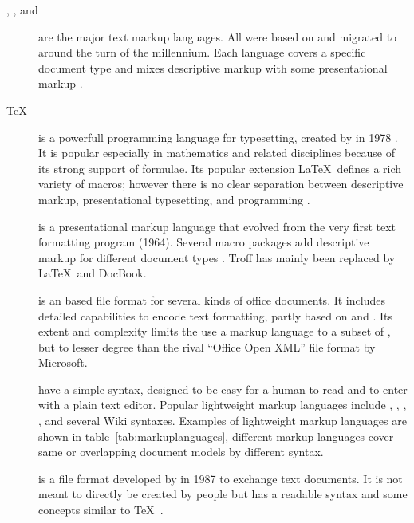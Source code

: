 \begin{description}

\item[, , and ] are the major text
markup languages. All were based on  and migrated to
 around the turn of the millennium. Each language covers a
specific document type and mixes descriptive markup with some presentational
markup \cite{Hickson2009,Burnard2007,Walsh2010}.

\item[\TeX] %
is a powerfull programming language
for typesetting, created by  in 1978 \cite{Knuth1984}.
It is popular especially in mathematics and related disciplines because of
its strong support of formulae. Its popular extension \LaTeX\ defines a rich
variety of macros; however there is no clear separation between descriptive
markup, presentational typesetting, and programming \cite{Lamport1994}.

\item[] is a presentational markup language that evolved from the
very first text formatting program  (1964). Several macro
packages add descriptive markup for different document types
\cite{Dougherty1987}. Troff has mainly been replaced by \LaTeX\ and DocBook.

\item[] is an  based file format for
several kinds of office documents. It includes detailed capabilities to encode
text formatting, partly based on  and 
\cite{OpenDocument2012}. Its extent and complexity limits the use a markup
language to a subset of , but to lesser degree than the rival
``Office Open XML'' file format by Microsoft.

\item[] have a simple syntax, designed to
be easy for a human to read and to enter with a plain text editor. Popular
lightweight markup languages include , ,
, , and several Wiki syntaxes. Examples of lightweight
markup languages are shown in table~\ref{tab:markuplanguages}, different
markup languages cover same or overlapping document models by different syntax.

\item[] is a file format developed by
 in 1987 to exchange text documents. It is not meant to
directly be created by people but has a readable syntax and some concepts
similar to \TeX\ \cite{Burke2003}.


\end{description}
